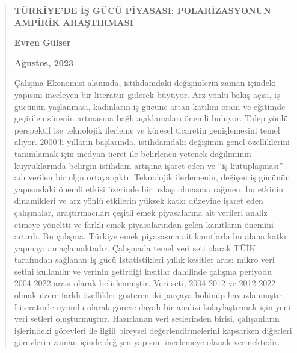 \renewcommand{\abstractname}{ÖZ}
\begin{abstract} 
\begin{center}
\textbf{TÜRKİYE'DE İŞ GÜCÜ PİYASASI: POLARİZASYONUN
AMPİRİK ARAŞTIRMASI}
\par\end{center}

\begin{center}
\textbf{Evren Gülser}
\par\end{center}

\begin{center}
\textbf{Ağustos, 2023}
\par\end{center}

Çalışma Ekonomisi alanında, istihdamdaki değişimlerin
zaman içindeki yapısını inceleyen bir literatür giderek büyüyor.
Arz yönlü bakış açısı, iş gücünün yaşlanması,
kadınların iş gücüne artan katılım oranı ve eğitimde
geçirilen sürenin artmasına bağlı açıklamaları önemli
buluyor. Talep yönlü perspektif ise teknolojik ilerleme ve küresel
ticaretin genişlemesini temel alıyor. 2000'li yılların başlarında,
istihdamdaki değişimin genel özelliklerini tanımlamak için
medyan ücret ile belirlenen yetenek dağılımının kuyruklarında
belirgin istihdam artışına işaret eden ve \textquotedblleft iş
kutuplaşması\textquotedblright{} adı verilen bir olgu ortaya
çıktı. Teknolojik ilerlemenin, değişen iş gücünün
yapısındaki önemli etkisi üzerinde bir uzlaşı olmasına
rağmen, bu etkinin dinamikleri ve arz yönlü etkilerin yüksek katkı
düzeyine işaret eden çalışmalar, araştırmacıları
çeşitli emek piyasalarına ait verileri analiz etmeye yöneltti
ve farklı emek piyasalarından gelen kanıtların önemini artırdı.
Bu çalışma, Türkiye emek piyasasına ait kanıtlarla bu alana
katkı yapmayı amaçlamaktadır. Çalışmada temel veri seti
olarak TÜİK tarafından sağlanan İş gücü İstatistikleri
yıllık kesitler arası mikro veri setini kullanılır ve verinin
getirdiği kısıtlar dahilinde çalışma periyodu 2004-2022
arası olarak belirlenmiştir. Veri seti, 2004-2012 ve 2012-2022
olmak üzere farklı özellikler gösteren iki parçaya bölünüp havuzlanmıştır.
Literatürle uyumlu olarak göreve dayalı bir analizi kolaylaştırmak
için yeni veri setleri oluşturmuştur. Hazırlanan veri setlerinden
birisi, çalışanların işlerindeki görevleri ile ilgili
bireysel değerlendirmelerini kapsarken diğerleri görevlerin
zaman içinde değişen yapısını incelemeye olanak vermektedir. 


\end{abstract}
